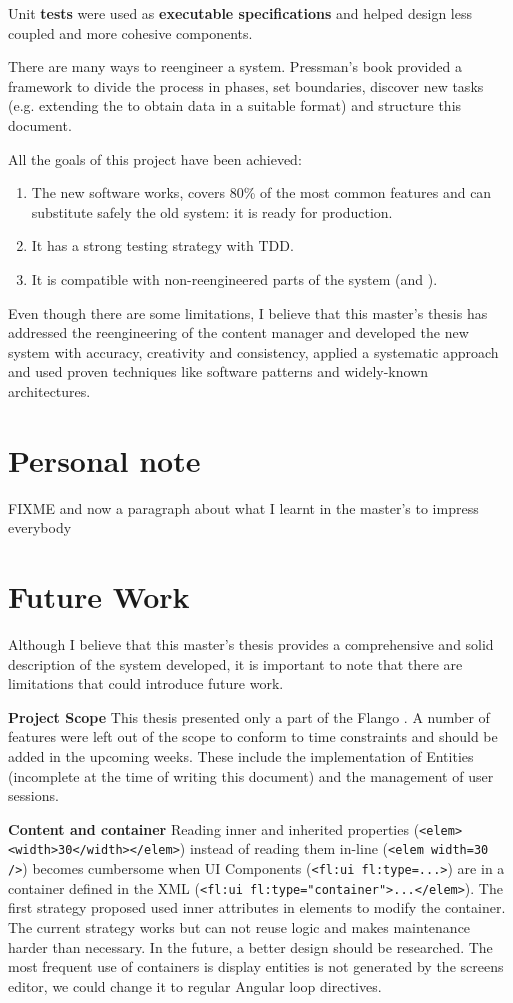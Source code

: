 Unit \textbf{tests} were used as \textbf{executable specifications} and helped design less coupled and more cohesive components.

There are many ways to reengineer a system.
Pressman's book provided a framework to divide the process in phases, set boundaries, discover new tasks (e.g. extending the \flangobe to obtain data in a suitable format) and structure this document.

All the goals of this project have been achieved:
\begin{enumerate}
\item The new software works, covers 80\% of the most common features and can substitute safely the old \flash system: it is ready for production.
\item It has a strong testing strategy with \ac{TDD}.
\item It is compatible with non-reengineered parts of the system (\flangobe and \flangofe).
\end{enumerate}

Even though there are some limitations, I believe that this master's thesis has addressed the reengineering of the content manager and developed the new system with accuracy, creativity and consistency, applied a systematic approach and used proven techniques like software patterns and widely-known architectures.


\section{Personal note}
FIXME and now a paragraph about what I learnt in the master's to impress everybody


\section{Future Work}
Although I believe that this master's thesis provides a comprehensive and solid description of the system developed, it is important to note that there are limitations that could introduce future work.

\textbf{Project Scope} This thesis presented only a part of the Flango \cm . 
A number of features were left out of the scope to conform to time constraints and should be added in the upcoming weeks.
These include the implementation of Entities (incomplete at the time of writing this document) and the management of user sessions.

\textbf{Content and container} Reading inner and inherited properties (\lstinline$<elem><width>30</width></elem>$) instead of reading them in-line (\lstinline$<elem width=30 />$) becomes cumbersome when UI Components (\lstinline$<fl:ui fl:type=...>$) are in a container defined in the \ac{XML} (\lstinline$<fl:ui fl:type="container">...</elem>$).
The first strategy proposed used inner attributes in elements to modify the container.
The current strategy works but can not reuse logic and makes maintenance harder than necessary.
In the future, a better design should be researched.
The most frequent use of containers is display entities is not generated by the screens editor, we could change it to regular Angular loop directives.

